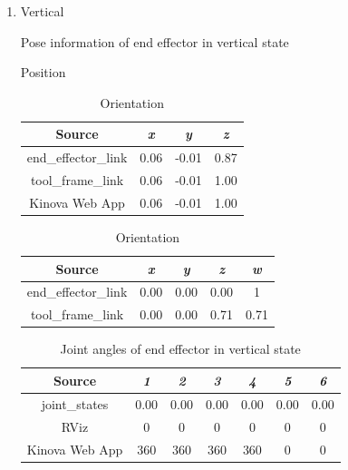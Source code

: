 \documentclass[12pt]{article}
\begin{document}
\begin{enumerate}
\begin{enumerate}
        \item Vertical
        
        \begin{table}[H]
            \caption{Pose information of end effector in vertical state}
            \begin{subtable}{.4\linewidth}
                \centering
                \caption{Position}
                \begin{tabular}{cccc}
                    \toprule
                    Source & \textit{x} & \textit{y} & \textit{z} \\\midrule
                    end\_effector\_link & 0.06 & -0.01 & 0.87 \\
                    tool\_frame\_link & 0.06 & -0.01 & 1.00 \\
                    Kinova Web App & 0.06 & -0.01 & 1.00 \\\bottomrule
                \end{tabular}
            \end{subtable}
            \hfill
            \begin{subtable}{.52\linewidth}
                \centering
                \caption{Orientation}
                \begin{tabular}{ccccc}
                    \toprule
                    Source & \textit{x} & \textit{y} & \textit{z} & \textit{w} \\\midrule
                    end\_effector\_link & 0.00 & 0.00 & 0.00 & 1 \\
                    tool\_frame\_link & 0.00 & 0.00 & 0.71 & 0.71 \\\bottomrule
                \end{tabular}
            \end{subtable}
        \end{table}
        \vspace{-10pt}
        \begin{table}[H]
            \centering
            \caption{Joint angles of end effector in vertical state}
            \begin{tabular}{ccccccc}
            \toprule
            Source & \textit{1} & \textit{2} & \textit{3} & \textit{4} & \textit{5} & \textit{6} \\\midrule
            joint\_states & 0.00 & 0.00 & 0.00 & 0.00 & 0.00 & 0.00 \\
            RViz & 0 & 0 & 0 & 0 & 0 & 0 \\
            Kinova Web App & 360 & 360 & 360 & 360 & 0 & 0 \\\bottomrule
            \end{tabular}
        \end{table}


\end{enumerate}
\end{enumerate}
\end{document}

